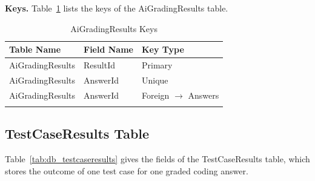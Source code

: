 \par\ifdim\dimexpr\pagegoal-\pagetotal\relax<180pt\newpage\fi
\noindent\textbf{Keys.} Table~\ref{tab:keys_aigradingresults} lists the keys of the AiGradingResults table.

{\small
\begin{longtable}{>{\raggedright\arraybackslash}p{4.0cm}>{\raggedright\arraybackslash}p{4.6cm}>{\raggedright\arraybackslash}p{4.6cm}}
\caption{AiGradingResults Keys}\label{tab:keys_aigradingresults}\\
\hline\hline
\textbf{Table Name} & \textbf{Field Name} & \textbf{Key Type} \\ \hline
\endfirsthead
\hline\hline
\endlastfoot
AiGradingResults & ResultId & Primary \\*
AiGradingResults & AnswerId & Unique \\*
AiGradingResults & AnswerId & Foreign $\rightarrow$ Answers \\*
\end{longtable}
}

\par\ifdim\dimexpr\pagegoal-\pagetotal\relax<376pt\newpage\fi
\subsection{TestCaseResults Table}
Table~\ref{tab:db_testcaseresults} gives the fields of the TestCaseResults table, which stores the outcome of one test case for one graded coding answer.

